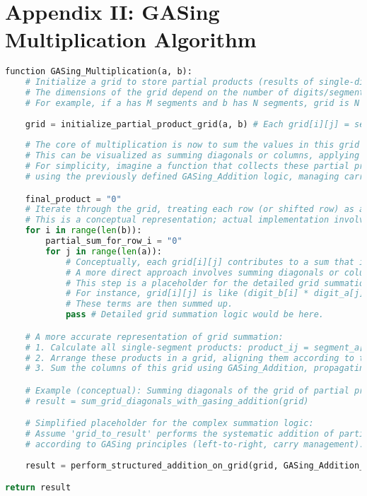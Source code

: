 \section{Appendix II: GASing Multiplication Algorithm}
\label{appendix:multiplication}
\begin{lstlisting}[language=Python,caption={GASing Multiplication Algorithm (Conceptual)}]
function GASing_Multiplication(a, b):
    # Initialize a grid to store partial products (results of single-digit multiplications)
    # The dimensions of the grid depend on the number of digits/segments in a and b.
    # For example, if a has M segments and b has N segments, grid is N x M.
        
    grid = initialize_partial_product_grid(a, b) # Each grid[i][j] = segment_b[i] * segment_a[j]
        
    # The core of multiplication is now to sum the values in this grid in a structured way.
    # This can be visualized as summing diagonals or columns, applying GASing addition.
    # For simplicity, imagine a function that collects these partial products and sums them
    # using the previously defined GASing_Addition logic, managing carries appropriately.

    final_product = "0"
    # Iterate through the grid, treating each row (or shifted row) as a number to be added.
    # This is a conceptual representation; actual implementation involves careful alignment and summation.
    for i in range(len(b)):
        partial_sum_for_row_i = "0"
        for j in range(len(a)):
            # Conceptually, each grid[i][j] contributes to a sum that is then added.
            # A more direct approach involves summing diagonals or columns with carries.
            # This step is a placeholder for the detailed grid summation logic.
            # For instance, grid[i][j] is like (digit_b[i] * digit_a[j]) * 10^(position_factor)
            # These terms are then summed up.
            pass # Detailed grid summation logic would be here.

    # A more accurate representation of grid summation:
    # 1. Calculate all single-segment products: product_ij = segment_a[j] * segment_b[i]
    # 2. Arrange these products in a grid, aligning them according to their place value.
    # 3. Sum the columns of this grid using GASing_Addition, propagating carries.

    # Example (conceptual): Summing diagonals of the grid of partial products
    # result = sum_grid_diagonals_with_gasing_addition(grid)

    # Simplified placeholder for the complex summation logic:
    # Assume 'grid_to_result' performs the systematic addition of partial products
    # according to GASing principles (left-to-right, carry management).
    
    result = perform_structured_addition_on_grid(grid, GASing_Addition_function_pointer)

return result
\end{lstlisting}

